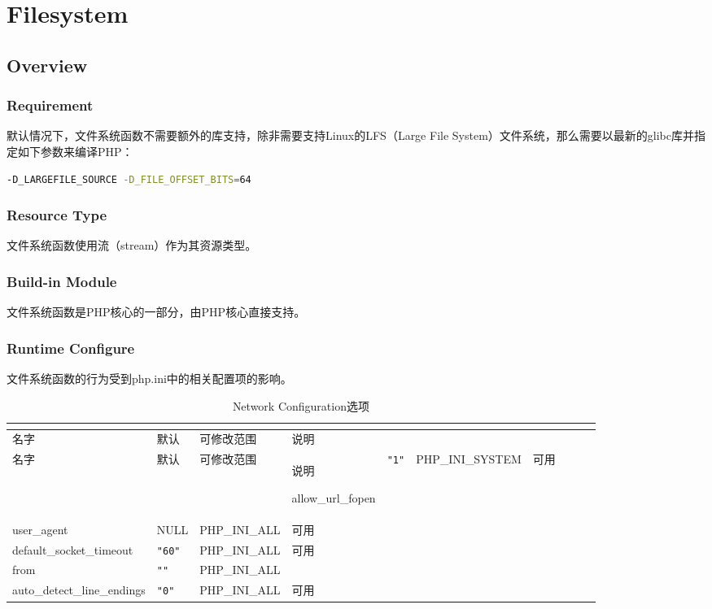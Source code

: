 \part{Filesystem}


\chapter{Overview}


\section{Requirement}

默认情况下，文件系统函数不需要额外的库支持，除非需要支持Linux的LFS（Large File System）文件系统，那么需要以最新的glibc库并指定如下参数来编译PHP：

\begin{lstlisting}[language=bash]
-D_LARGEFILE_SOURCE -D_FILE_OFFSET_BITS=64
\end{lstlisting}

\section{Resource Type}

文件系统函数使用流（stream）作为其资源类型。


\section{Build-in Module}

文件系统函数是PHP核心的一部分，由PHP核心直接支持。

\section{Runtime Configure}

文件系统函数的行为受到php.ini中的相关配置项的影响。



\begin{longtable}{|m{100pt}|m{30pt}|m{50pt}|m{100pt}|}
\tabularnewline\hline
名字&默认&可修改范围&说明
\endhead

\caption{Network Configuration选项}\\
\hline
名字&默认&可修改范围&说明
\endfirsthead

\endfoot

\endlastfoot
\hline
allow\_url\_fopen			&\texttt{"1"}	&PHP\_INI\_SYSTEM&可用\\
\hline
user\_agent				&NULL		&PHP\_INI\_ALL	&可用\\
\hline
default\_socket\_timeout	&\texttt{"60"}	&PHP\_INI\_ALL	&可用\\
\hline
from					&\texttt{""}	&PHP\_INI\_ALL	& \\
\hline
auto\_detect\_line\_endings	&\texttt{"0"}	&PHP\_INI\_ALL	&可用\\
\hline
\end{longtable}



